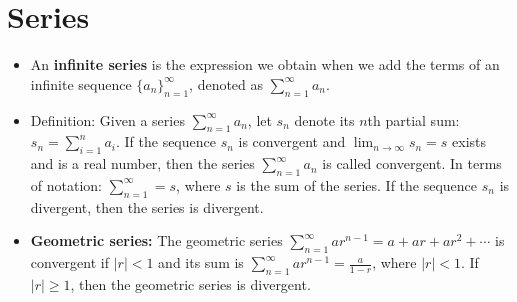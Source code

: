 \documentclass[11pt]{article}
\theoremstyle{definition}
\theoremstyle{remark}
\begin{document}
\section{Series}
\begin{itemize}
\item An \textbf{infinite series} is the expression we obtain when we add the terms of an infinite sequence $\{a_n\}^{\infty}_{n=1}$, denoted as $\displaystyle \sum_{n=1}^\infty a_n$.

\item Definition: Given a series $\displaystyle \sum_{n=1}^\infty a_n$, let $s_n$ denote its $n$th partial sum: $\displaystyle s_n = \sum_{i=1}^n a_i$. If the sequence ${s_n}$ is convergent and $\lim_{n \to \infty} s_n = s$ exists and is a real number, then the series $\displaystyle \sum_{n=1}^\infty a_n$ is called convergent. In terms of notation: $\displaystyle \sum_{n=1}^\infty = s$, where $s$ is the sum of the series. If the sequence ${s_n}$ is divergent, then the series is divergent. 

\item \textbf{Geometric series:} The geometric series $\displaystyle \sum_{n=1}^\infty ar^{n-1} = a + ar + ar^2 + \cdots$ is convergent if $|r| < 1$ and its sum is $\displaystyle \sum_{n=1}^\infty ar^{n-1} = \frac{a}{1-r}$, where $|r|<1$. If $|r| \geq 1$, then the geometric series is divergent. 

\end{itemize}
\end{document}

